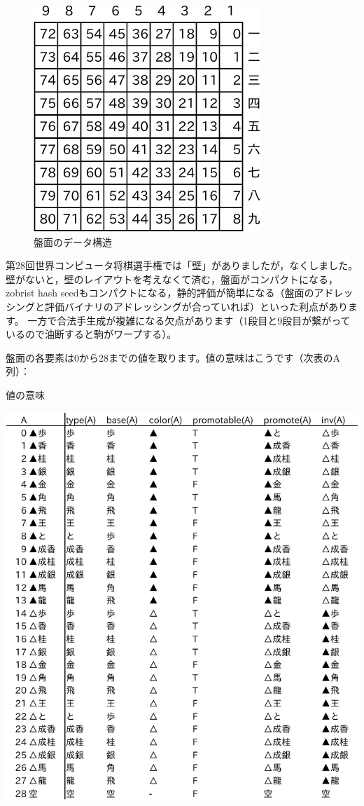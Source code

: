 \documentclass[a4paper]{ltjsarticle}
\begin{document}
\begin{figure}[H]
  \centering
  \includegraphics{fig/fig1.pdf}
  \caption{盤面のデータ構造}
\end{figure}

第28回世界コンピュータ将棋選手権では「壁」がありましたが，なくしました。
壁がないと，壁のレイアウトを考えなくて済む，盤面がコンパクトになる，zobrist hash seedもコンパクトになる，静的評価が簡単になる（盤面のアドレッシングと評価バイナリのアドレッシングが合っていれば）といった利点があります。
一方で合法手生成が複雑になる欠点があります（1段目と9段目が繋がっているので油断すると駒がワープする）。

盤面の各要素は0から28までの値を取ります。値の意味はこうです（次表のA列）：

\begin{table}[H]
  \centering
  \caption{値の意味}
  \includegraphics{fig/fig2.pdf}
\end{table}
\end{document}
